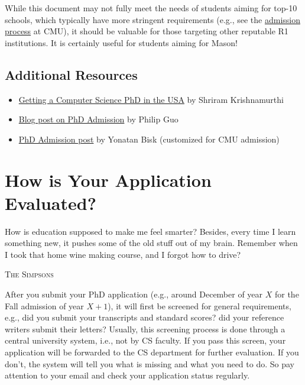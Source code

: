 \documentclass[oneside,11pt,dvipsnames]{book}
\begin{document}
While this document may not fully meet the needs of students aiming for top-10 schools, which typically have more stringent requirements (e.g., see the \href{https://da-data.blogspot.com/2015/03/reflecting-on-cs-graduate-admissions.html}{admission process} at CMU), it should be valuable for those targeting other reputable R1 institutions. It is certainly useful for students aiming for Mason!


\section*{Additional Resources}
\begin{itemize}
  \item \href{https://parentheticallyspeaking.org/articles/us-cs-phd-faq/}{Getting a Computer Science PhD in the USA} by Shriram Krishnamurthi
  \item  \href{https://pg.ucsd.edu/PhD-application-tips.htm}{Blog post on PhD Admission} by Philip Guo
  \item   \href{https://talkingtorobots.com/FAQ.html}{PhD Admission post} by Yonatan Bisk (customized for CMU admission)
\end{itemize}

\chapter{How is Your Application Evaluated?}\label{sec:evalapps}

\epigraph{How is education supposed to make me feel smarter? Besides, every time I learn something new, it pushes some of the old stuff out of my brain. Remember when I took that home wine making course, and I forgot how to drive?}{\textsc{The Simpsons}}

After you submit your PhD application (e.g., around December of year $X$ for the Fall admission of year $X+1$), it will first be screened
for general requirements, e.g., did you submit your transcripts and standard scores? did your reference writers submit their letters? Usually, this screening process is done through a central university system, i.e., not by CS faculty. If you pass this screen, your application will be forwarded to the CS department for further evaluation. If you don't,  the system will tell you what is missing and what you need to do. So pay attention to your email and check your application status regularly.
\end{document}
